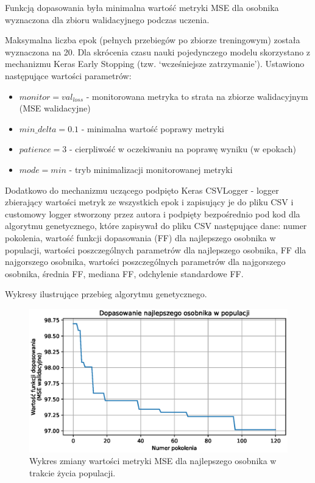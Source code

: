 \documentclass[a4paper,12pt]{article}
\numberwithin{figure}{section}
\begin{document}
    \bigskip

    Funkcją dopasowania była minimalna wartość metryki MSE dla osobnika wyznaczona dla zbioru walidacyjnego podczas uczenia.

    \bigskip

    Maksymalna liczba epok (pełnych przebiegów po zbiorze treningowym) została wyznaczona na 20. Dla skrócenia czasu nauki pojedynczego modelu skorzystano z mechanizmu Keras Early Stopping (tzw. `wcześniejsze zatrzymanie'). Ustawiono następujące wartości parametrów:
    \begin{itemize}
        \item $monitor = val_{loss}$ - monitorowana metryka to strata na zbiorze walidacyjnym (MSE walidacyjne)
        \item $min\_delta = 0.1$ - minimalna wartość poprawy metryki
        \item $patience = 3$ - cierpliwość w oczekiwaniu na poprawę wyniku (w epokach)
        \item $mode = min$ - tryb minimalizacji monitorowanej metryki
    \end{itemize}

    \bigskip

    Dodatkowo do mechanizmu uczącego podpięto Keras CSVLogger - logger zbierający wartości metryk ze wszystkich epok i zapisujący je do pliku CSV i customowy logger stworzony przez autora i podpięty bezpośrednio pod kod dla algorytmu genetycznego, które zapisywał do pliku CSV następujące dane: numer pokolenia, wartość funkcji dopasowania (FF) dla najlepszego osobnika w populacji, wartości poszczególnych parametrów dla najlepszego osobnika, FF dla najgorszego osobnika, wartości poszczególnych parametrów dla najgorszego osobnika, średnia FF, mediana FF, odchylenie standardowe FF.

    \bigskip

    Wykresy ilustrujące przebieg algorytmu genetycznego.

    \bigskip

    \begin{figure}[H]
        \centering
        \includegraphics[width=\textwidth]{g_a_best_fitness}
        \caption{Wykres zmiany wartości metryki MSE dla najlepszego osobnika w trakcie życia populacji.}
        \label{fig:g_a_best_fitness}
    \end{figure}
\end{document}

